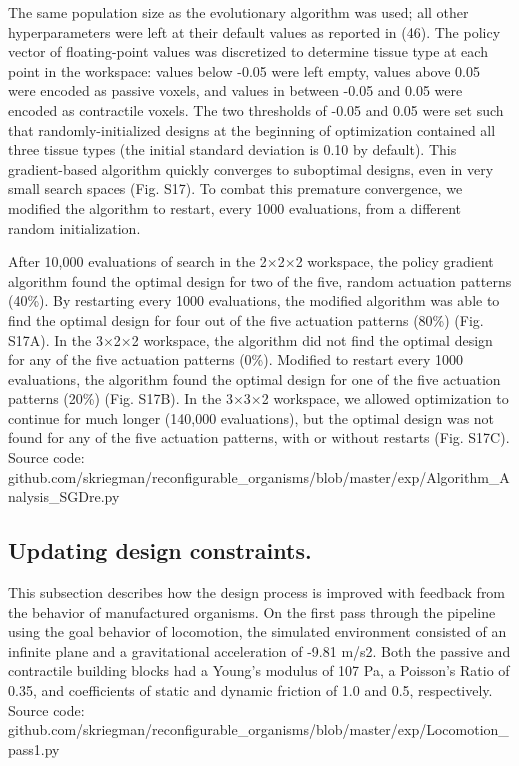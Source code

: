 The same population size as the evolutionary algorithm was used; all other hyperparameters were left at their default values as reported in (46). The policy vector of floating-point values was discretized to determine tissue type at each point in the workspace: values below -0.05 were left empty, values above 0.05 were encoded as passive voxels, and values in between -0.05 and 0.05 were encoded as contractile voxels. The two thresholds of -0.05 and 0.05 were set such that randomly-initialized designs at the beginning of optimization contained all three tissue types (the initial standard deviation is 0.10 by default).
This gradient-based algorithm quickly converges to suboptimal designs, even in very small search spaces (Fig. S17). To combat this premature convergence, we modified the algorithm to restart, every 1000 evaluations, from a different random initialization.

 After 10,000 evaluations of search in the 2{$\times$}2{$\times$}2 workspace, the policy gradient algorithm found the optimal design for two of the five, random actuation patterns (40\%). By restarting every 1000 evaluations, the modified algorithm was able to find the optimal design for four out of the five actuation patterns (80\%) (Fig. S17A). In the 3{$\times$}2{$\times$}2 workspace, the algorithm did not find the optimal design for any of the five actuation patterns (0\%). Modified to restart every 1000 evaluations, the algorithm found the optimal design for one of the five actuation patterns (20\%) (Fig. S17B). In the 3{$\times$}3{$\times$}2 workspace, we allowed optimization to continue for much longer (140,000 evaluations), but the optimal design was not found for any of the five actuation patterns, with or without restarts (Fig. S17C). Source code: github.com/skriegman/reconfigurable\_organisms/blob/master/exp/Algorithm\_Analysis\_SGDre.py


\subsection*{Updating design constraints.}

This subsection describes how the design process is improved with feedback from the behavior of manufactured organisms. 
On the first pass through the pipeline using the goal behavior of locomotion, the simulated environment consisted of an infinite plane and a gravitational acceleration of -9.81 m/s2. Both the passive and contractile building blocks had a Young's modulus of 107 Pa, a Poisson's Ratio of 0.35, and coefficients of static and dynamic friction of 1.0 and 0.5, respectively. Source code: github.com/skriegman/reconfigurable\_organisms/blob/master/exp/Locomotion\_pass1.py

